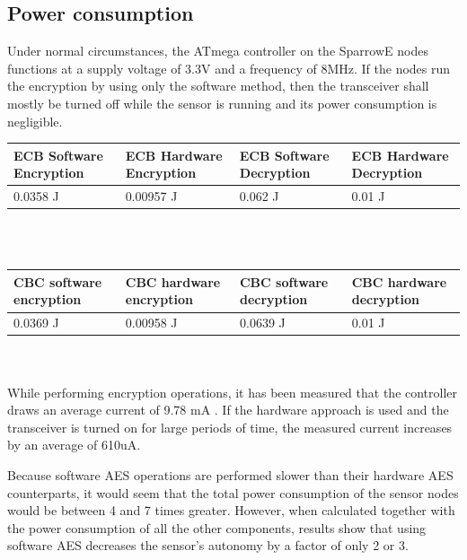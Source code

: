 \subsection{Power consumption}

Under normal circumstances, the ATmega controller on the SparrowE nodes functions at a 
supply voltage of 3.3V and a frequency of 8MHz. If the nodes run the encryption by using 
only the software method, then the transceiver shall mostly be turned off while the sensor is 
running and its power consumption is negligible.\\


\begin{tabular}{ | p{1.75cm} | p{1.75cm} | p{1.75cm} | p{1.75cm} |}
    \hline
    ECB Software Encryption & ECB Hardware Encryption & ECB Software Decryption & ECB Hardware Decryption \\ \hline
    0.0358 J & 0.00957 J & 0.062 J & 0.01 J \\ \hline
\end{tabular}\\\\


\begin{tabular}{ | p{1.75cm} | p{1.75cm} | p{1.75cm} | p{1.75cm} |}
    \hline
    CBC software encryption & CBC hardware encryption & CBC software decryption & CBC hardware decryption \\ \hline
    0.0369 J & 0.00958 J & 0.0639 J & 0.01 J \\ \hline
\end{tabular}\\\\



While performing encryption operations, it has been measured that the controller draws an average current 
of 9.78 mA . If the hardware approach is used and the transceiver is turned on for large periods of
time, the measured current increases by an average of 610uA.

Because software AES operations are performed slower than their hardware AES counterparts, 
it would seem that the total power consumption of the sensor nodes would be between 4 and 7 times greater.
However, when calculated together with the power consumption of all the other components, 
results show that using software AES decreases the sensor's autonomy by a factor of only 
2 or 3. 

